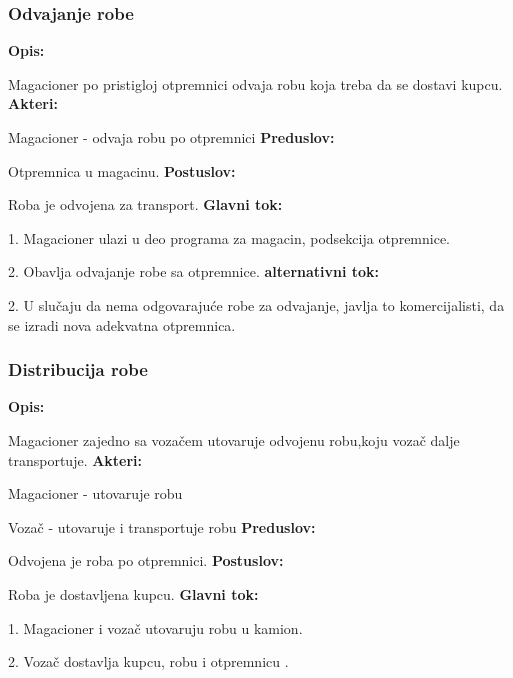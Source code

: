 \clearpage

\subsubsection{Odvajanje robe}

\textbf{Opis:}

Magacioner po pristigloj otpremnici odvaja robu koja treba da se dostavi kupcu.
\newline
\textbf{Akteri:}

Magacioner - odvaja robu po otpremnici
\newline
\textbf{Preduslov:}

Otpremnica u magacinu.
\newline
\textbf{Postuslov:}

Roba je odvojena za transport.
\newline
\textbf{Glavni tok:}

1. Magacioner ulazi u deo programa za magacin, podsekcija otpremnice.

2. Obavlja odvajanje robe sa otpremnice.
\newline
\textbf{alternativni tok:}

2. U slučaju da nema odgovarajuće robe za odvajanje, javlja to komercijalisti, da se izradi nova adekvatna otpremnica.

\subsubsection{Distribucija robe}

\textbf{Opis:}

Magacioner zajedno sa vozačem utovaruje odvojenu robu,koju vozač dalje transportuje.
\newline
\textbf{Akteri:}

Magacioner - utovaruje robu

Vozač - utovaruje i transportuje robu
\newline
\textbf{Preduslov:}

Odvojena je roba po otpremnici.
\newline
\textbf{Postuslov:}

Roba je dostavljena kupcu.
\newline
\textbf{Glavni tok:}

1. Magacioner i vozač utovaruju robu u kamion.

2. Vozač dostavlja kupcu, robu i otpremnicu .

\clearpage